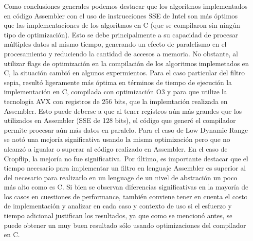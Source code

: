 \documentclass[a4paper]{article}
\begin{document}
Como conclusiones generales podemos destacar que los algoritmos implementados
en código Assembler con el uso de instrucciones SSE de Intel son más óptimos que
las implementaciones de los algoritmos en C (que se compilaron sin ningún 
tipo de optimización). Esto se debe principalmente a
su capacidad de procesar múltiples datos al mismo tiempo, generando un efecto
de paralelismo en el procesamiento y reduciendo la cantidad de accesos a memoria.
No obstante, al utilizar flags de optimización en la compilación de los algoritmos
implemetados en C, la situación cambió en algunos expermientos. Para el caso particular del filtro sepia, resultó ligeramente más óptima en términos de tiempo de ejecución
la implementación en C, compilada con optimización O3 y para que utilize la tecnología AVX con registros de 256 bits, que la implemtación realizada en Assembler. Esto puede deberse a que al tener registros aún más grandes que los utilizados en Assembler (SSE de 128 bits), el código que generó el compilador permite procesar aún más datos en paralelo. 
Para el caso de Low Dynamic Range se notó una mejoría significativa usando la misma optimización pero que no alcanzó a igualar o superar al código realizado en Assembler. En el caso de Cropflip, la mejoría no fue significativa.
Por último, es importante destacar que el tiempo necesario para implementar un filtro en lenguaje Assembler es superior al del necesario para realizarlo en un lenguage de un nivel de abstración un poco más alto como es C. Si bien se observan diferencias significativas en la mayoría de los casos en cuestiones de performance, también conviene tener en cuenta el costo de implementación y analizar en cada caso y contexto de uso si el esfuerzo y tiempo adicional justifican los resultados, ya que como se mencionó antes, se puede obtener un muy buen resultado sólo usando optimizaciones del compilador en C.   
\end{document}
